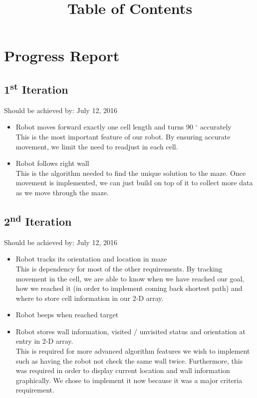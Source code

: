 \documentclass[11pt]{article}
\date{}
\title{Table of Contents}
\newcommand{\ts}{\textsuperscript}
\begin{document}
\maketitle

\tableofcontents

\newpage




\section{Progress Report}
\subsection{1\ts{st} Iteration}
Should be achieved by: July 12, 2016
\begin{itemize}
\item Robot moves forward exactly one cell length and turns 90 $^{\circ}$ accurately\\
This is the most important feature of our robot. By ensuring accurate movement, we limit the need to readjust in each cell.
\item Robot follows right wall\\
This is the algorithm needed to find the unique solution to the maze. Once movement is implemented, we can just build on top of it to collect more data as we move through the maze. 
\end{itemize}

\subsection{2\ts{nd} Iteration}
Should be achieved by: July 12, 2016
\begin{itemize}
\item Robot tracks its orientation and location in maze\\
This is dependency for most of the other requirements. By tracking movement in the cell, we are able to know when we have reached our goal, how we reached it (in order to implement coming back shortest path) and where to store cell information in our 2-D array.
\item Robot beeps when reached target
\item Robot stores wall information, visited / unvisited status and orientation at entry in 2-D array.\\
This is required for more advanced algorithm features we wish to implement such as having the robot not check the same wall twice. Furthermore, this was required in order to display current location and wall information graphically. We chose to implement it now because it was a major criteria requirement. 
\end{itemize}
\end{document}
